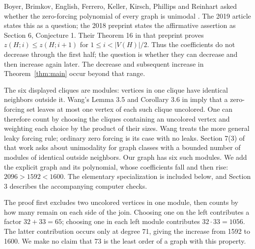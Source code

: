 \documentclass[11pt]{article}
\begin{document}
Boyer, Brimkov, English, Ferrero, Keller, Kirsch, Phillips and Reinhart
asked whether the zero-forcing polynomial of every graph is unimodal
\cite[Question 1]{boyer}. The 2019 article states this as a question;
the 2018 preprint states the affirmative assertion as Section 6,
Conjecture 1. Their Theorem 16 in that preprint proves
$z(H;i)\leq z(H;i+1)$ for $1\leq i<|V(H)|/2$.
Thus the coefficients do not decrease through the first half; the question
is whether they can decrease and then increase again later.
The decrease and subsequent increase in Theorem~\ref{thm:main} occur
beyond that range.

The six displayed cliques are modules: vertices in one clique have
identical neighbors outside it. Wang's Lemma 3.5 and Corollary 3.6 in
\cite{wang} imply that a zero-forcing set leaves at most one vertex of
each such clique uncolored. One can therefore count by choosing the
cliques containing an uncolored vertex and weighting each choice by the
product of their sizes. Wang treats the more general leaky forcing rule;
ordinary zero forcing is its case with no leaks. Section 7(3) of that
work asks about unimodality for graph classes with a bounded number of
modules of identical outside neighbors. Our graph has six such modules.
We add the explicit graph and its polynomial, whose coefficients fall and
then rise: $2096>1592<1600$. The elementary specialization is included
below, and Section 3 describes the accompanying computer checks.

The proof first excludes two uncolored vertices in one module, then counts
by how many remain on each side of the join. Choosing one on the left
contributes a factor $32+33=65$; choosing one in each left module contributes
$32\cdot33=1056$. The latter contribution occurs only at degree 71, giving
the increase from 1592 to 1600. We make no claim that 73 is the least order
of a graph with this property.
\end{document}
